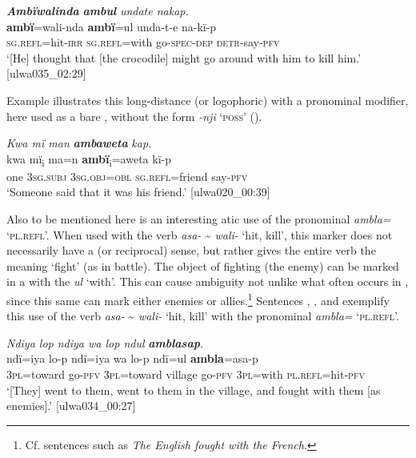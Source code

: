 \ea%
    \label{ex:pron:24}
          \textbf{\textit{Ambïwalinda}} \textbf{\textit{ambul}} \textit{undate nakap.}\\
\gll    \textbf{ambï}=wali-nda  \textbf{ambï}=ul    unda-t-e    na-kï{}-p\\
    \textsc{sg.refl}=hit-\textsc{irr}  \textsc{sg.refl}=with  go\textsc{{}-spec-dep}  \textsc{detr-}say-\textsc{pfv}\\
\glt `[He] thought that [the crocodile] might go around with him to kill him.’ [ulwa035\_02:29]
\z


Example  illustrates this long-distance  (or logophoric)  with a  pronominal modifier, here used as a bare , without the form \textit{{}-nji} ‘\textsc{poss}’ ().

\ea%
    \label{ex:pron:25}
          \textit{Kwa mï man} \textbf{\textit{ambaweta}} \textit{kap.}\\
\gll    kwa  mï\textsubscript{i}      ma=n      \textbf{ambï}\textsubscript{i}=aweta     kï{}-p\\
    one    3\textsc{sg.subj}  3\textsc{sg.obj=obl}  \textsc{sg.refl}=friend  say-\textsc{pfv}\\
\glt `Someone said that it was his friend.’ [ulwa020\_00:39]
\z

Also to be mentioned here is an interesting atic use of the  pronominal  \textit{ambla=} ‘\textsc{pl.refl}’. When used with the verb \textit{asa-} {\textasciitilde} \textit{wali-} ‘hit, kill’, this marker does not necessarily have a  (or reciprocal) sense, but rather gives the entire verb the  meaning ‘fight’ (as in battle). The object of fighting (the enemy) can be marked in a  with the  \textit{ul} ‘with’. This can cause ambiguity not unlike what often occurs in , since this same  can mark either enemies or allies.\footnote{Cf.  sentences such as \textit{The English fought with the French}.} Sentences , , and  exemplify this use of the verb \textit{asa-} {\textasciitilde} \textit{wali-} ‘hit, kill’ with the  pronominal  \textit{ambla=} ‘\textsc{pl.refl}’.

\ea%
    \label{ex:pron:26}
          \textit{Ndiya lop ndiya wa lop ndul} \textbf{\textit{amblasap}}.\\
\gll ndï=iya    lo-p  ndï=iya    wa    lo-p  ndï=ul     \textbf{ambla}=asa-p\\
    \textsc{3pl}=toward  go-\textsc{pfv}  3\textsc{pl=}toward  village  go-\textsc{pfv}  3\textsc{pl}=with    \textsc{pl.refl}=hit-\textsc{pfv}\\
\glt `[They] went to them, went to them in the village, and fought with them [as enemies].’ [ulwa034\_00:27]
\z

